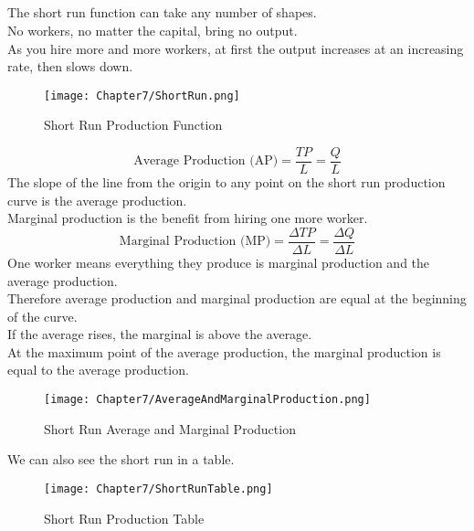 \subsection{}
The short run function can take any number of shapes.\\
No workers, no matter the capital, bring no output.\\
As you hire more and more workers, at first the output increases at an increasing rate, then slows down.
\begin{figure}[H]
    \centering
    \texttt{[image: Chapter7/ShortRun.png]}
    \caption{Short Run Production Function}
\end{figure}
\begin{equation}
    \text{Average Production (AP)}= \frac{TP}{L} = \frac{Q}{L}
\end{equation}
The slope of the line from the origin to any point on the short run production curve is the average production.\\
Marginal production is the benefit from hiring one more worker.
\begin{equation}
    \text{Marginal Production (MP)} = \frac{\Delta TP}{\Delta L} = \frac{\Delta Q}{\Delta L}
\end{equation}
One worker means everything they produce is marginal production and the average production.\\
Therefore average production and marginal production are equal at the beginning of the curve.\\
If the average rises, the marginal is above the average.\\
At the maximum point of the average production, the marginal production is equal to the average production.
\begin{figure}[H]
    \centering
    \texttt{[image: Chapter7/AverageAndMarginalProduction.png]}
    \caption{Short Run Average and Marginal Production}
\end{figure}
We can also see the short run in a table.
\begin{figure}[H]
    \centering
    \texttt{[image: Chapter7/ShortRunTable.png]}
    \caption{Short Run Production Table}
\end{figure}